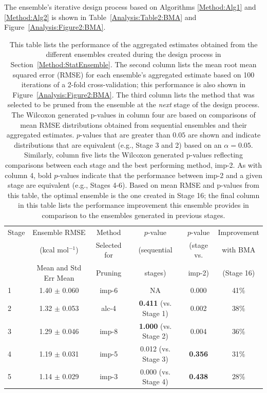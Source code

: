 \documentclass[journal=jpcbfk, manuscript=article]{achemso}
\newcommand{\+}[1]{\ensuremath{\mathbf{#1}}}
\begin{document}
The ensemble's iterative design process based on Algorithms \ref{Method:Alg1} and \ref{Method:Alg2} is shown in Table~\ref{Analysis:Table2:BMA} and Figure~\ref{Analysis:Figure2:BMA}.
\begin{table}[t!]
	\centering
	\caption[Table 2]{This table lists the performance of the aggregated estimates obtained from the different ensembles created during the design process in Section~\ref{Method:StatEnsemble}.
	The second column lists the mean root mean squared error (RMSE) for each ensemble's aggregated estimate based on 100 iterations of a 2-fold cross-validation; this performance is also shown in Figure~\ref{Analysis:Figure2:BMA}.
	The third column lists the method that was selected to be pruned from the ensemble at the \emph{next} stage of the design process.
	The Wilcoxon generated p-values in column four are based on comparisons of mean RMSE distributions obtained from sequential ensembles and their aggregated estimates.
	$p$-values that are greater than $0.05$ are shown and indicate distributions that are equivalent (e.g., Stage 3 and 2) based on an $\alpha = 0.05$.
	Similarly, column five lists the Wilcoxon generated p-values reflecting comparisons between each stage and the best performing method, imp-2.
	As with column 4, bold $p$-values indicate that the performance between imp-2 and a given stage are equivalent (e.g., Stages 4-6).
	Based on mean RMSE and p-values from this table, the optimal ensemble is the one created in Stage 16; the final column in this table lists the performance improvement this ensemble provides in comparison to the ensembles generated in previous stages.}
	\scriptsize
	\begin{tabular}{l|c|c|c|c|c}
		\hline
		\hline
		Stage	& Ensemble RMSE		& Method 			& $p$-value		& $p$-value		& Improvement \\
				& (kcal mol$^{-1}$)	& Selected for		& (sequential 	& (stage vs.	& with BMA \\
				& Mean and Std Err Mean	& Pruning			& stages)		& imp-2)		& (Stage 16) \\
		\hline
		 1 & 1.40 $\pm$ 0.060 & imp-6 & NA & 0.000 & 41\%\\
		 2  & 1.32 $\pm$ 0.053 & alc-4&  \textbf{0.411} (vs. Stage 1) & 0.002 & 38\%\\
		 3 & 1.29 $\pm$ 0.046 & imp-8 & \textbf{1.000}  (vs. Stage 2) & 0.004 & 36\%\\
		 4 & 1.19 $\pm$ 0.031 & imp-5 & 0.012  (vs. Stage 3) & \textbf{0.356} & 31\%\\
		 5 & 1.14 $\pm$ 0.029 & imp-3 & 0.000  (vs. Stage 4) & \textbf{0.438} & 28\%\\

\end{tabular}
\end{table}
\end{document}
